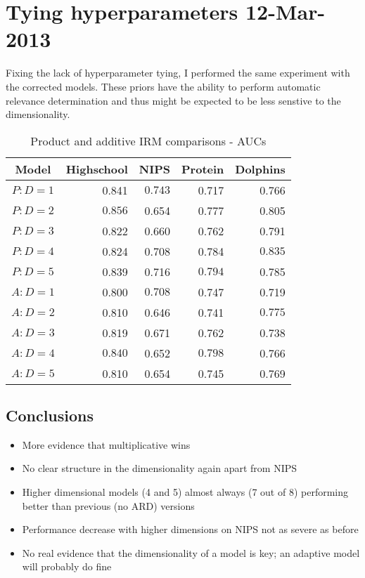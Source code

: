 \documentclass[twoside,11pt]{article}
\begin{document}
\section{Tying hyperparameters 12-Mar-2013}

Fixing the lack of hyperparameter tying, I performed the same experiment with the corrected models.
These priors have the ability to perform automatic relevance determination and thus might be expected to be less senstive to the dimensionality.

\begin{table*}[ht!]
\caption{{\small
Product and additive IRM comparisons - AUCs
}}
\label{tbl:Prod Add IRM 11-Mar-2013}
\begin{center}
\begin{tabular}{c | r r r r}
Model & Highschool & NIPS & Protein & Dolphins \\
\hline
$P : D=1$ & 0.841 & $\mathbf{0.743}$ & 0.717 & 0.766 \\
$P : D=2$ & $\mathbf{0.856}$ & 0.654 & 0.777 & 0.805 \\
$P : D=3$ & 0.822 & 0.660 & 0.762 & 0.791 \\
$P : D=4$ & 0.824 & 0.708 & 0.784 & $\mathbf{0.835}$ \\
$P : D=5$ & 0.839 & 0.716 & $\mathbf{0.794}$ & 0.785 \\
\hline
$A : D=1$ & 0.800 & $\mathbf{0.708}$ & 0.747 & 0.719 \\
$A : D=2$ & 0.810 & 0.646 & 0.741 & $\mathbf{0.775}$ \\
$A : D=3$ & 0.819 & 0.671 & 0.762 & 0.738 \\
$A : D=4$ & $\mathbf{0.840}$ & 0.652 & $\mathbf{0.798}$ & 0.766 \\
$A : D=5$ & 0.810 & 0.654 & 0.745 & 0.769 \\
\end{tabular}
\end{center}
\end{table*}

\subsection{Conclusions}

\begin{itemize}
\item More evidence that multiplicative wins
\item No clear structure in the dimensionality again apart from NIPS
\item Higher dimensional models (4 and 5) almost always (7 out of 8) performing better than previous (no ARD) versions
\item Performance decrease with higher dimensions on NIPS not as severe as before
\item No real evidence that the dimensionality of a model is key; an adaptive model will probably do fine
\end{itemize}
\end{document}
